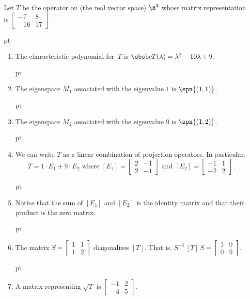 \begin{exam}  Let $T$ be the operator on (the real vector space) $\R^2$ whose matrix representation
is $\begin{bmatrix} -7 &   8 \\ -16 &  17 \end{bmatrix}$.

 pt

 \begin{enumerate}
  \item The characteristic polynomial for~$T$ is
                     $\sbsb cT(\lambda) = \lambda^2 - 10\lambda + 9$.

 pt

  \item The eigenspace $M_1$ associated with the eigenvalue $1$ is $\spn \{(1,1)\}$.

 pt

  \item The eigenspace $M_2$ associated with the eigenvalue $9$ is $\spn \{(1,2)\}$.

 pt

  \item We can write $T$ as a linear combination of projection operators.  In particular,
   \[ T = 1\cdot E_1 + 9\cdot E_2 \text{ where } [E_1] = \begin{bmatrix} 2 & -1 \\ 2 & -1 \end{bmatrix}
\text{ and } [E_2] = \begin{bmatrix} -1 & 1 \\ -2 & 2 \end{bmatrix}\,. \]

 pt

  \item Notice that the sum of $[E_1]$ and $[E_2]$ is the identity matrix and that their
product is the zero matrix.

 pt

  \item The matrix  $S = \begin{bmatrix} 1 &  1  \\ 1 &  2 \end{bmatrix}$  diagonalizes
$[T]$. That is, $S^{-1}\,[T]\,S = \begin{bmatrix} 1 &  0  \\ 0 &  9 \end{bmatrix}$.


 pt


  \item A matrix representing $\sqrt T$ is $\begin{bmatrix} -1 &  2  \\ -4 &  5 \end{bmatrix}$.
 \end{enumerate}
\end{exam}

